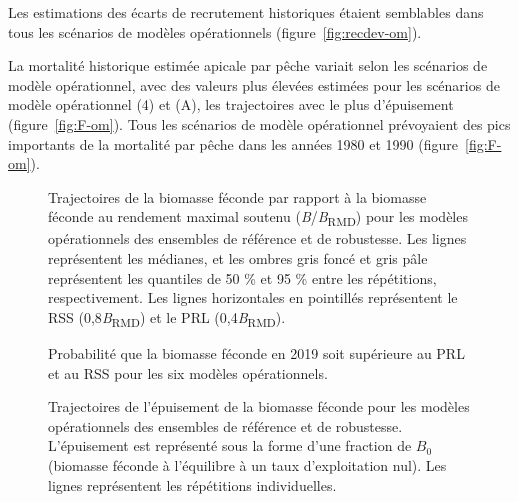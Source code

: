 \documentclass[french,11pt]{book}
\begin{document}
Les estimations des écarts de recrutement historiques étaient semblables dans tous les scénarios de modèles opérationnels (figure~\ref{fig:recdev-om}).

La mortalité historique estimée apicale par pêche variait selon les scénarios de modèle opérationnel, avec des valeurs plus élevées estimées pour les scénarios de modèle opérationnel (4) et (A), les trajectoires avec le plus d'épuisement (figure~\ref{fig:F-om}). Tous les scénarios de modèle opérationnel prévoyaient des pics importants de la mortalité par pêche dans les années 1980 et 1990 (figure~\ref{fig:F-om}).


\begin{figure}[htb]

{\centering {} 

}

\caption{Trajectoires de la biomasse féconde par rapport à la biomasse féconde au rendement maximal soutenu (\emph{B}/\emph{B}\textsubscript{RMD}) pour les modèles opérationnels des ensembles de référence et de robustesse. Les lignes représentent les médianes, et les ombres gris foncé et gris pâle représentent les quantiles de 50 \% et 95 \% entre les répétitions, respectivement. Les lignes horizontales en pointillés représentent le RSS (0,8\emph{B}\textsubscript{RMD}) et le PRL (0,4\emph{B}\textsubscript{RMD}).}\label{fig:biomass-om}
\end{figure}

\begin{figure}[htb]

{\centering {} 

}

\caption{Probabilité que la biomasse féconde en 2019 soit supérieure au PRL et au RSS pour les six modèles opérationnels.}\label{fig:ref-pt}
\end{figure}

\begin{figure}[htb]

{\centering {} 

}

\caption{Trajectoires de l'épuisement de la biomasse féconde pour les modèles opérationnels des ensembles de référence et de robustesse. L'épuisement est représenté sous la forme d'une fraction de \(B_0\) (biomasse féconde à l'équilibre à un taux d'exploitation nul). Les lignes représentent les répétitions individuelles.}\label{fig:depletion-om}
\end{figure}
\end{document}
